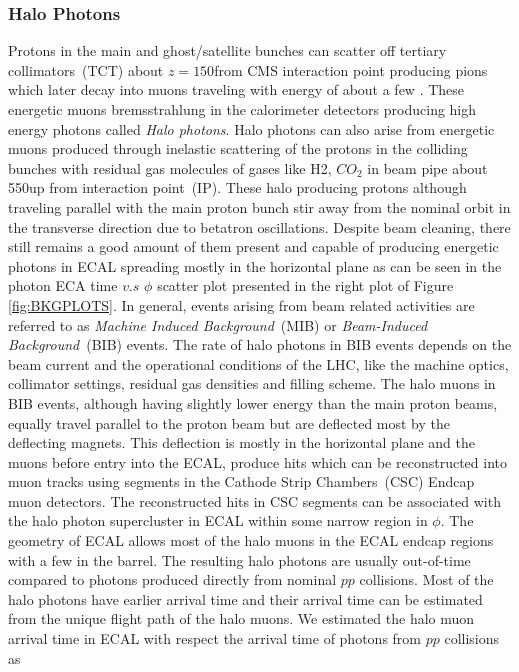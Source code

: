 \subsubsection{Halo Photons}
  Protons in the main and ghost/satellite bunches can scatter off tertiary collimators~(TCT) about $z = 150$\m from CMS interaction point producing pions which later decay into muons traveling with energy of about a few \TeV. These energetic muons bremsstrahlung in the calorimeter detectors producing high energy photons called \textit{Halo photons}. Halo photons can also arise from energetic muons produced through inelastic scattering  of the protons in the colliding bunches with residual gas molecules of gases like H2, $CO_{2}$ in beam pipe about 550\m up from interaction  point~(IP).
These halo producing protons although traveling parallel with the main proton bunch stir away from the nominal orbit in the transverse direction due to betatron oscillations. Despite beam cleaning, there still remains a good amount of them present  and capable of producing energetic photons in ECAL spreading mostly in the horizontal plane as can be seen in the photon ECA time $v.s$ $\phi$ scatter plot presented in the right plot of Figure \ref{fig:BKGPLOTS}. In general, events arising from  beam related activities are referred to as \textit{Machine Induced Background}~(MIB) or \textit{Beam-Induced Background}~(BIB) events. The rate of halo photons in BIB events depends on the beam current and the operational conditions of the LHC, like the  machine optics, collimator settings, residual gas densities and filling scheme. 
\newline
The halo muons in BIB events, although having slightly lower energy than the main proton beams, equally travel parallel to the proton beam but are deflected most by the deflecting magnets. This deflection is mostly in the horizontal plane and the muons before entry into the ECAL, produce hits which can be reconstructed into muon tracks using segments in the Cathode Strip Chambers~(CSC) Endcap muon detectors. The reconstructed hits in CSC segments can be associated with the halo photon supercluster in ECAL within some narrow region in $\phi$. The geometry of ECAL allows most of the halo muons in the ECAL endcap regions with a few in the barrel. The resulting halo photons are usually out-of-time compared to photons produced directly from nominal $pp$ collisions. Most of the halo photons have earlier arrival time and their arrival time can be estimated from the unique flight path of the halo muons. We estimated the halo muon arrival time in ECAL with respect the arrival time of photons from $pp$ collisions as 
